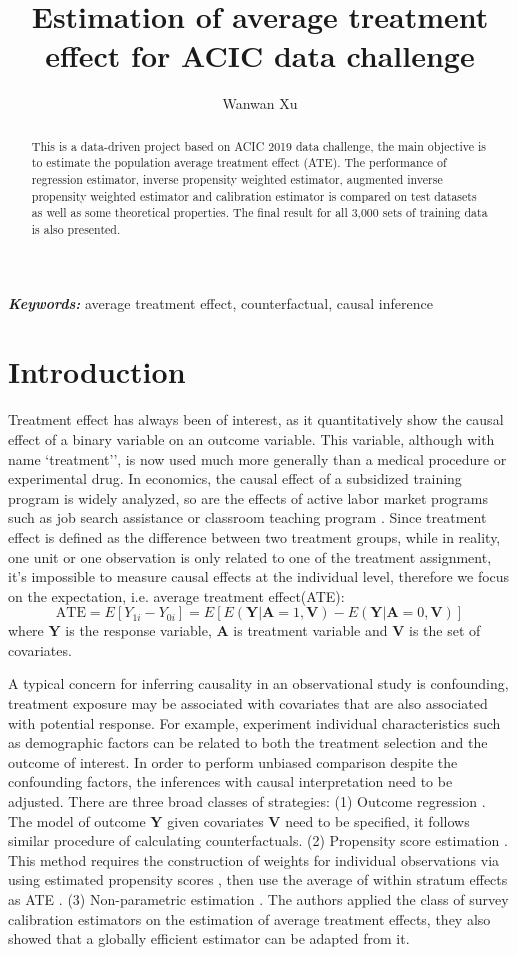\documentclass[11pt, oneside]{article}
\title{Estimation of average treatment effect for ACIC data challenge}
\author[]{Wanwan Xu}
\affil[]{Univeristy of Connecticut, Department of Statistics}
\date{}
\providecommand{\keywords}[1]
{
  \small	
  \textbf{\textit{Keywords:}} #1
}
\newcommand{\bA}{\mathbf{A}}
\newcommand{\bY}{\mathbf{Y}}
\newcommand{\bV}{\mathbf{V}}
\begin{document}
\maketitle

\begin{abstract}
This is a data-driven project based on ACIC 2019 data challenge, the main objective is to estimate the population average treatment effect (ATE). The performance of regression estimator, inverse propensity weighted estimator, augmented inverse propensity weighted estimator and calibration estimator is compared on test datasets as well as some theoretical properties. The final result for all 3,000 sets of training data is also presented. 
\end{abstract}
\keywords{average treatment effect, counterfactual, causal inference}

\section{Introduction}
Treatment effect has always been of interest, as it quantitatively  show the causal effect of a binary variable on an outcome variable. This variable, although with name `treatment'', is now used much more generally than a medical procedure or experimental drug. In economics, the causal effect of a subsidized training program \cite{Ashenfelter1978} is widely analyzed, so are the effects of active labor market programs such as job search assistance or classroom teaching program \cite{LaLonde1986}. Since treatment effect is defined as the difference between two treatment groups, while in reality, one unit or one observation is only related to one of the treatment assignment, it's impossible to measure causal effects at the individual level, therefore we focus on the expectation, i.e. average treatment effect(ATE):
$$\mbox{ATE}=E[Y_{1i}-Y_{0i}]=E[E(\bY | \bA = 1, \bV) - E(\bY | \bA = 0, \bV)]$$
where $\bY$ is the response variable, $\bA$ is treatment variable and $\bV$ is the set of covariates. 

A typical concern for inferring causality in an observational study is confounding, treatment exposure may be associated with covariates that are also associated with potential response. For example, experiment individual characteristics such as demographic factors can be related to both the treatment selection and the outcome of interest. In order to perform unbiased comparison despite the confounding factors, the inferences with causal interpretation need to be adjusted. There are three broad classes of strategies: (1) Outcome regression \cite{Oaxaca1973}. The model of outcome $\bY$ given covariates $\bV$ need to be specified, it follows similar procedure of calculating counterfactuals. (2) Propensity score estimation \cite{Rosenbaum1983}. This method requires the construction of weights for individual observations via using estimated propensity scores \cite{Robins2000}, then use the average of within stratum effects as ATE \cite{Rosenbaum1984}. (3) Non-parametric estimation \cite{Chan2016}. The authors applied the class of survey calibration estimators on the estimation of average treatment effects, they also showed that a globally efficient estimator can be adapted from it. 
\end{document}
